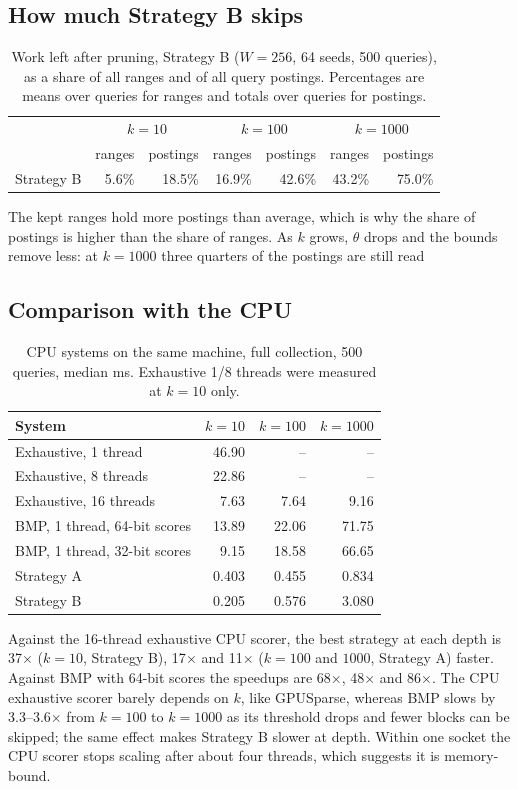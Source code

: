 \documentclass[11pt]{article}
\begin{document}
\subsection{How much Strategy B skips}
\begin{table}[H]
\centering
\caption{Work left after pruning, Strategy B ($W=256$, 64 seeds, 500 queries), as a share of all ranges and of all
query postings. Percentages are means over queries for ranges and totals over queries for postings.}
\label{tab:work}
\begin{tabular}{lrrrrrr}
\toprule
 & \multicolumn{2}{c}{$k=10$} & \multicolumn{2}{c}{$k=100$} & \multicolumn{2}{c}{$k=1000$}\\
 & ranges & postings & ranges & postings & ranges & postings\\
\midrule
Strategy B & 5.6\% & 18.5\% & 16.9\% & 42.6\% & 43.2\% & 75.0\%\\
\bottomrule
\end{tabular}
\end{table}
The kept ranges hold more postings than average, which is why the share of postings is higher than the share of
ranges. As $k$ grows, $\theta$ drops and the bounds remove less: at $k=1000$ three quarters of the postings are
still read

\subsection{Comparison with the CPU}
\begin{table}[H]
\centering
\caption{CPU systems on the same machine, full collection, 500 queries, median ms.
Exhaustive 1/8 threads were measured at $k=10$ only.}
\label{tab:cpu}
\begin{tabular}{lrrr}
\toprule
System & $k=10$ & $k=100$ & $k=1000$\\
\midrule
Exhaustive, 1 thread & 46.90 & -- & --\\
Exhaustive, 8 threads & 22.86 & -- & --\\
Exhaustive, 16 threads & 7.63 & 7.64 & 9.16\\
BMP, 1 thread, 64-bit scores & 13.89 & 22.06 & 71.75\\
BMP, 1 thread, 32-bit scores & 9.15 & 18.58 & 66.65\\
\midrule
Strategy A & 0.403 & 0.455 & 0.834\\
Strategy B & 0.205 & 0.576 & 3.080\\
\bottomrule
\end{tabular}
\end{table}
Against the 16-thread exhaustive CPU scorer, the best strategy at each depth is 37$\times$ ($k=10$, Strategy B),
17$\times$ and 11$\times$ ($k=100$ and $1000$, Strategy A) faster. Against BMP with 64-bit scores the
speedups are 68$\times$, 48$\times$ and 86$\times$. The CPU exhaustive scorer barely depends on $k$, like GPUSparse, whereas BMP slows by
3.3--3.6$\times$ from $k=100$ to $k=1000$ as its threshold drops and fewer blocks can be skipped; the same
effect makes Strategy B slower at depth. Within one socket the CPU scorer stops scaling after about four
threads, which suggests it is memory-bound.
\end{document}
